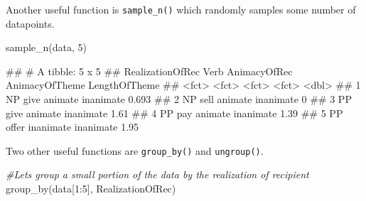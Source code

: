 \documentclass[
]{book}
\newenvironment{Shaded}{\begin{snugshade}}{\end{snugshade}}
\newcommand{\CommentTok}[1]{\textcolor[rgb]{0.56,0.35,0.01}{\textit{#1}}}
\newcommand{\DecValTok}[1]{\textcolor[rgb]{0.00,0.00,0.81}{#1}}
\newcommand{\FunctionTok}[1]{\textcolor[rgb]{0.00,0.00,0.00}{#1}}
\newcommand{\NormalTok}[1]{#1}
\newcommand{\SpecialCharTok}[1]{\textcolor[rgb]{0.00,0.00,0.00}{#1}}
\begin{document}
Another useful function is \texttt{sample\_n()} which randomly samples some number of datapoints.

\begin{Shaded}
\begin{Highlighting}[]
\FunctionTok{sample\_n}\NormalTok{(data, }\DecValTok{5}\NormalTok{)}
\end{Highlighting}
\end{Shaded}

\begin{Shaded}
\begin{Highlighting}[]
\NormalTok{\#\# \# A tibble: 5 x 5}
\NormalTok{\#\#   RealizationOfRec Verb  AnimacyOfRec AnimacyOfTheme LengthOfTheme}
\NormalTok{\#\#   \textless{}fct\textgreater{}            \textless{}fct\textgreater{} \textless{}fct\textgreater{}        \textless{}fct\textgreater{}                  \textless{}dbl\textgreater{}}
\NormalTok{\#\# 1 NP               give  animate      inanimate              0.693}
\NormalTok{\#\# 2 NP               sell  animate      inanimate              0    }
\NormalTok{\#\# 3 PP               give  animate      inanimate              1.61 }
\NormalTok{\#\# 4 PP               pay   animate      inanimate              1.39 }
\NormalTok{\#\# 5 PP               offer inanimate    inanimate              1.95}
\end{Highlighting}
\end{Shaded}

Two other useful functions are \texttt{group\_by()} and \texttt{ungroup()}.

\begin{Shaded}
\begin{Highlighting}[]
\CommentTok{\#Let\textquotesingle{}s group a small portion of the data by the realization of recipient}
\FunctionTok{group\_by}\NormalTok{(data[}\DecValTok{1}\SpecialCharTok{:}\DecValTok{5}\NormalTok{], RealizationOfRec)}
\end{Highlighting}
\end{Shaded}
\end{document}
